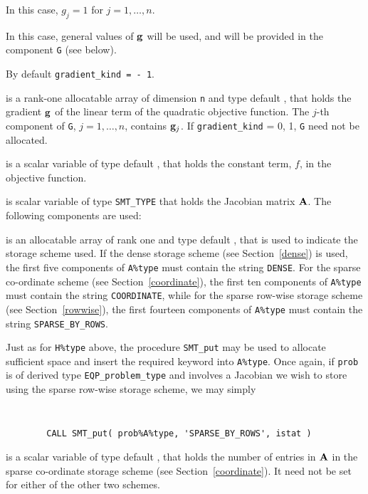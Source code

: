 \documentclass{galahad}
\newcommand{\packagename}{EQP}
\begin{document}
\begin{description}
\begin{description}
 In this case, $g_{j} = 1$ for $j = 1, \ldots , n$.

 In this case, general values of ${\mathbf{g}}$ will be used,
     and will be provided in the component {\tt G} (see below).
\end{description}
By default {\tt gradient\_kind = - 1}.

 is a rank-one allocatable array of dimension {\tt n} and type 
default \realdp, that holds the gradient ${\mathbf{g}}$ 
of the linear term of the quadratic objective function.
The $j$-th component of 
{\tt G}, $j = 1,  \ldots ,  n$, contains ${\mathbf{g}}_{j}$.
If {\tt gradient\_kind} {= 0, 1}, {\tt G} need not be allocated.

 is a scalar variable of type default \realdp, that holds 
the constant term, $f$, in the objective function.

 is scalar variable of type {\tt SMT\_TYPE} 
that holds the Jacobian matrix ${\mathbf{A}}$. The following components are used:

\begin{description}

 is an allocatable array of rank one and type default \character, that
is used to indicate the storage scheme used. If the dense storage scheme 
(see Section~\ref{dense}) is used, 
the first five components of {\tt A\%type} must contain the
string {\tt DENSE}.
For the sparse co-ordinate scheme (see Section~\ref{coordinate}), 
the first ten components of {\tt A\%type} must contain the
string {\tt COORDINATE}, while 
for the sparse row-wise storage scheme (see Section~\ref{rowwise}),
the first fourteen components of {\tt A\%type} must contain the
string {\tt SPARSE\_BY\_ROWS}.

Just as for {\tt H\%type} above, the procedure {\tt SMT\_put} 
may be used to allocate sufficient space and insert the required keyword
into {\tt A\%type}.
Once again, if {\tt prob} is of derived type {\tt \packagename\_problem\_type}
and involves a Jacobian we wish to store using the sparse row-wise 
storage scheme, we may simply
{\tt 
\begin{verbatim}
        CALL SMT_put( prob%A%type, 'SPARSE_BY_ROWS', istat )
\end{verbatim}
}
\noindent

 is a scalar variable of type default \integer, that 
holds the number of entries in ${\mathbf{A}}$
in the sparse co-ordinate storage scheme (see Section~\ref{coordinate}). 
It need not be set for either of the other two schemes.


\end{description}
\end{description}
\end{document}
